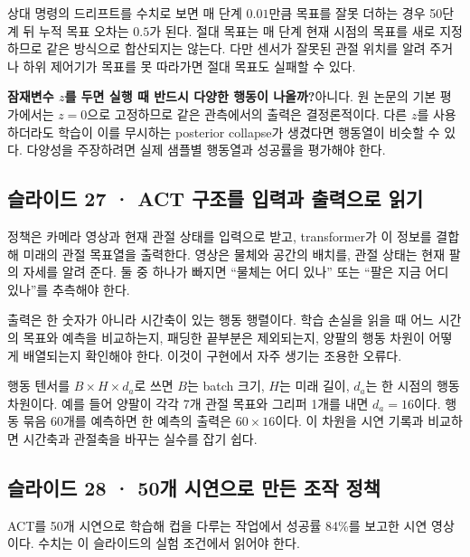 \documentclass[11pt,a4paper]{article}
\begin{document}
상대 명령의 드리프트를 수치로 보면 매 단계 $0.01$만큼 목표를 잘못 더하는 경우 50단계 뒤 누적 목표 오차는 $0.5$가 된다. 절대 목표는 매 단계 현재 시점의 목표를 새로 지정하므로 같은 방식으로 합산되지는 않는다. 다만 센서가 잘못된 관절 위치를 알려 주거나 하위 제어기가 목표를 못 따라가면 절대 목표도 실패할 수 있다.\par

\par\medskip\noindent\textbf{잠재변수 $z$를 두면 실행 때 반드시 다양한 행동이 나올까?}\quad 아니다. 원 논문의 기본 평가에서는 $z=0$으로 고정하므로 같은 관측에서의 출력은 결정론적이다. 다른 $z$를 사용하더라도 학습이 이를 무시하는 posterior collapse가 생겼다면 행동열이 비슷할 수 있다. 다양성을 주장하려면 실제 샘플별 행동열과 성공률을 평가해야 한다.\par

\subsection{슬라이드 27 · ACT 구조를 입력과 출력으로 읽기}

정책은 카메라 영상과 현재 관절 상태를 입력으로 받고, transformer가 이 정보를 결합해 미래의 관절 목표열을 출력한다. 영상은 물체와 공간의 배치를, 관절 상태는 현재 팔의 자세를 알려 준다. 둘 중 하나가 빠지면 “물체는 어디 있나” 또는 “팔은 지금 어디 있나”를 추측해야 한다.\par

출력은 한 숫자가 아니라 시간축이 있는 행동 행렬이다. 학습 손실을 읽을 때 어느 시간의 목표와 예측을 비교하는지, 패딩한 끝부분은 제외되는지, 양팔의 행동 차원이 어떻게 배열되는지 확인해야 한다. 이것이 구현에서 자주 생기는 조용한 오류다.\par

행동 텐서를 $B\times H\times d_a$로 쓰면 $B$는 batch 크기, $H$는 미래 길이, $d_a$는 한 시점의 행동 차원이다. 예를 들어 양팔이 각각 7개 관절 목표와 그리퍼 1개를 내면 $d_a=16$이다. 행동 묶음 60개를 예측하면 한 예측의 출력은 $60\times16$이다. 이 차원을 시연 기록과 비교하면 시간축과 관절축을 바꾸는 실수를 잡기 쉽다.\par

\subsection{슬라이드 28 · 50개 시연으로 만든 조작 정책}

ACT를 50개 시연으로 학습해 컵을 다루는 작업에서 성공률 84\%를 보고한 시연 영상이다. 수치는 이 슬라이드의 실험 조건에서 읽어야 한다.\par
\end{document}
